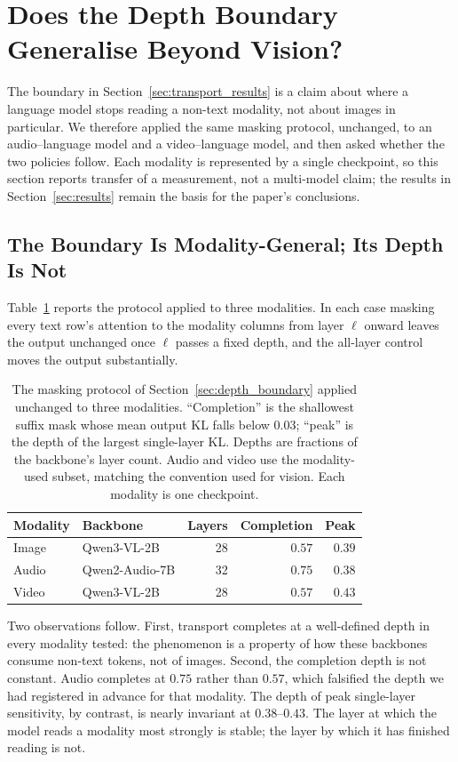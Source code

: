 \section{Does the Depth Boundary Generalise Beyond Vision?}
\label{sec:crossmodal}

The boundary in Section~\ref{sec:transport_results} is a claim about where a
language model stops reading a non-text modality, not about images in
particular. We therefore applied the same masking protocol, unchanged,
to an audio--language model and a video--language model, and then asked
whether the two policies follow. Each modality is represented by a
single checkpoint, so this section reports transfer of a measurement,
not a multi-model claim; the results in Section~\ref{sec:results} remain
the basis for the paper's conclusions.

\subsection{The Boundary Is Modality-General; Its Depth Is Not}

Table~\ref{tab:crossmodal_boundary} reports the protocol applied to
three modalities. In each case masking every text row's attention to
the modality columns from layer $\ell$ onward leaves the output
unchanged once $\ell$ passes a fixed depth, and the all-layer control
moves the output substantially.

\begin{table}[tb]
\centering\small
\caption{The masking protocol of Section~\ref{sec:depth_boundary} applied
unchanged to three modalities. ``Completion'' is the shallowest suffix
mask whose mean output KL falls below $0.03$; ``peak'' is the depth of
the largest single-layer KL. Depths are fractions of the backbone's
layer count. Audio and video use the modality-used subset, matching the
convention used for vision. Each modality is one checkpoint.}
\label{tab:crossmodal_boundary}
\begin{tabular}{llrrr}
\toprule
Modality & Backbone & Layers & Completion & Peak \\
\midrule
Image & Qwen3-VL-2B   & 28 & $0.57$ & $0.39$ \\
Audio & Qwen2-Audio-7B & 32 & $0.75$ & $0.38$ \\
Video & Qwen3-VL-2B   & 28 & $0.57$ & $0.43$ \\
\bottomrule
\end{tabular}
\end{table}

Two observations follow. First, transport completes at a well-defined
depth in every modality tested: the phenomenon is a property of how
these backbones consume non-text tokens, not of images. Second, the
completion depth is not constant. Audio completes at $0.75$ rather
than $0.57$, which falsified the depth we had registered in advance for
that modality. The depth of peak single-layer sensitivity, by contrast,
is nearly invariant at $0.38$--$0.43$. The layer at which the model
reads a modality most strongly is stable; the layer by which it has
finished reading is not.

